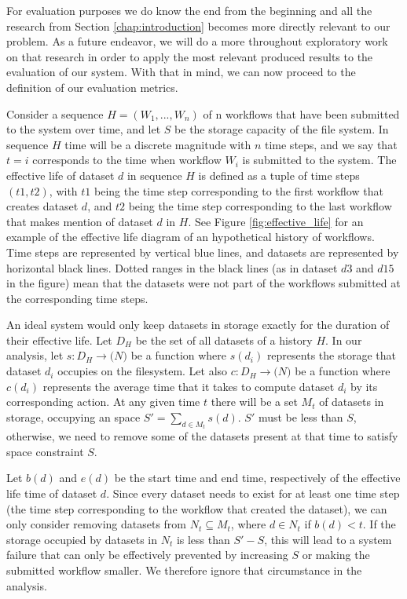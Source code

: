 For evaluation purposes we do know the end from the beginning and all the research from Section \ref{chap:introduction} becomes more directly relevant to our problem.  As a future endeavor, we will do a more throughout exploratory work on that research in order to apply the most relevant produced results to the evaluation of our system.  With that in mind, we can now proceed to the definition of our evaluation metrics.

Consider a sequence $H=(W_1, ..., W_n)$ of n workflows that have been submitted to the system over time, and let $S$ be the storage capacity of the file system.  In sequence $H$ time will be a discrete magnitude with $n$ time steps, and we say that $t = i$ corresponds to the time when workflow $W_i$ is submitted to the system. The effective life of dataset $d$ in sequence $H$ is defined as a tuple of time steps $(t1, t2)$, with $t1$ being the time step corresponding to the first workflow that creates dataset $d$, and  $t2$ being the time step corresponding to the last workflow that makes mention of dataset $d$ in $H$.  See Figure \ref{fig:effective_life} for an example of the effective life diagram of an hypothetical history of workflows.  Time steps are represented by vertical blue lines, and datasets are represented by horizontal black lines.  Dotted ranges in the black lines (as in dataset $d3$ and $d15$ in the figure) mean that the datasets were not part of the workflows submitted at the corresponding time steps.

An ideal system would only keep datasets in storage exactly for the duration of their effective life.  Let $D_H$ be the set of all datasets of a history $H$.  In our analysis, let $s: D_H \to \mathtt(N)$ be a function where $s(d_i)$ represents the storage that dataset $d_i$ occupies on the filesystem.  Let also $c: D_H \to \mathtt(N)$ be a function where $c(d_i)$ represents the average time that it takes to compute dataset $d_i$ by its corresponding action. At any given time $t$ there will be a set $M_t$ of datasets in storage, occupying an space $S' = \sum_{d \in M_t}{s(d)}$.  $S'$ must be less than $S$, otherwise, we need to remove some of the datasets present at that time to satisfy space constraint $S$.

Let $b(d)$ and $e(d)$ be the start time and end time, respectively of the effective life time of dataset $d$.  Since every dataset needs to exist for at least one time step (the time step corresponding to the workflow that created the dataset), we can only consider removing datasets from $N_t \subseteq M_t$, where $d \in N_t$ if $b(d) < t$.  If the storage occupied by datasets in $N_t$ is less than $S' - S$, this will lead to a system failure that can only be effectively prevented by increasing $S$ or making the submitted workflow smaller.  We therefore ignore that circumstance in the analysis.  


